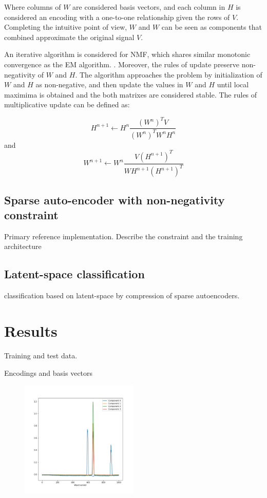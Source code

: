 \documentclass{article}
\begin{document}
Where columns of $W$ are considered basis vectors, and each column in $H$ is considered an encoding with a one-to-one relationship given the rows of $V$. Completing the intuitive point of view, $W$ and $W$ can be seen as components that combined approximate the original signal $V$.

An iterative algorithm is considered for NMF, which shares similar monotonic convergence as the EM algorithm. \cite{Dempster1977}. Moreover, the rules of update preserve non-negativity of $W$ and $H$. The algorithm approaches the problem by initialization of $W$ and $H$ as non-negative, and then update the values in $W$ and $H$ until local maximima is obtained and the both matrixes are considered stable. The rules of multiplicative update can be defined as:

\begin{equation}
H^{n+1} \leftarrow H^{n} \frac{(W^n)^TV}{(W^n)^TW^nH^n}
\end{equation}
and 
\begin{equation}
W^{n+1} \leftarrow W^{n} \frac{V(H^{n+1})^T}{WH^{n+1}(H^{n+1})^T}
\end{equation}


\subsection{Sparse auto-encoder with non-negativity constraint}

\cite{Vincent}


Primary reference implementation. Describe the constraint and the training architecture

\subsection{Latent-space classification}

classification based on latent-space by compression of sparse autoencoders.

\section{Results}
\label{sec:results}

Training and test data. 

Encodings and basis vectors

\begin{figure}
  \includegraphics[width=0.5\textwidth]{figures/raman_sim_3_encode_layer_1_finetune_13.png}
\end{figure}
\end{document}
